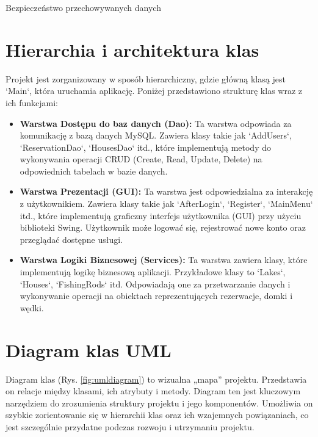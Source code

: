 Bezpieczeństwo przechowywanych danych

\section{Hierarchia i architektura klas}

Projekt jest zorganizowany w sposób hierarchiczny, gdzie główną klasą jest `Main`, która uruchamia aplikację. Poniżej przedstawiono strukturę klas wraz z ich funkcjami:

\begin{itemize}
    \item \textbf{Warstwa Dostępu do baz danych (Dao):} Ta warstwa odpowiada za komunikację z bazą danych MySQL. Zawiera klasy takie jak `AddUsers`, `ReservationDao`, `HousesDao` itd., które implementują metody do wykonywania operacji CRUD (Create, Read, Update, Delete) na odpowiednich tabelach w bazie danych.
    \item \textbf{Warstwa Prezentacji (GUI):} Ta warstwa jest odpowiedzialna za interakcję z użytkownikiem. Zawiera klasy takie jak `AfterLogin`, `Register`, `MainMenu` itd., które implementują graficzny interfejs użytkownika (GUI) przy użyciu biblioteki Swing. Użytkownik może logować się, rejestrować nowe konto oraz przeglądać dostępne usługi.
    \item \textbf{Warstwa Logiki Biznesowej (Services):} Ta warstwa zawiera klasy, które implementują logikę biznesową aplikacji. Przykładowe klasy to `Lakes`, `Houses`, `FishingRods` itd. Odpowiadają one za przetwarzanie danych i wykonywanie operacji na obiektach reprezentujących rezerwacje, domki i wędki.

\end{itemize}
\clearpage

\section{Diagram klas UML} 
Diagram klas (Rys. \ref{fig:umldiagram}) to wizualna „mapa” projektu.
Przedstawia on relacje między klasami, ich atrybuty i metody. Diagram ten jest kluczowym narzędziem do zrozumienia struktury projektu i jego komponentów. Umożliwia on szybkie zorientowanie się w hierarchii klas oraz ich wzajemnych powiązaniach, co jest szczególnie przydatne podczas rozwoju i utrzymaniu projektu.



